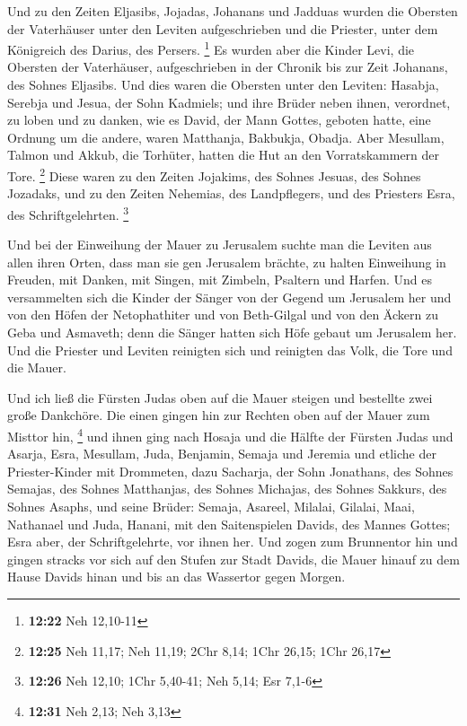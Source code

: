  Und zu den Zeiten Eljasibs, Jojadas, Johanans und
Jadduas wurden die Obersten der Vaterhäuser unter den Leviten
aufgeschrieben und die Priester, unter dem Königreich des Darius, des
Persers. \footnote{\textbf{12:22} Neh 12,10-11}  Es
wurden aber die Kinder Levi, die Obersten der Vaterhäuser,
aufgeschrieben in der Chronik bis zur Zeit Johanans, des Sohnes
Eljasibs.  Und dies waren die Obersten unter den Leviten:
Hasabja, Serebja und Jesua, der Sohn Kadmiels; und ihre Brüder neben
ihnen, verordnet, zu loben und zu danken, wie es David, der Mann Gottes,
geboten hatte, eine Ordnung um die andere,  waren
Matthanja, Bakbukja, Obadja. Aber Mesullam, Talmon und Akkub, die
Torhüter, hatten die Hut an den Vorratskammern der Tore. \footnote{\textbf{12:25}
  Neh 11,17; Neh 11,19; 2Chr 8,14; 1Chr 26,15; 1Chr 26,17}
 Diese waren zu den Zeiten Jojakims, des Sohnes Jesuas,
des Sohnes Jozadaks, und zu den Zeiten Nehemias, des Landpflegers, und
des Priesters Esra, des Schriftgelehrten. \footnote{\textbf{12:26} Neh
  12,10; 1Chr 5,40-41; Neh 5,14; Esr 7,1-6}

 Und bei der Einweihung der Mauer zu Jerusalem suchte man
die Leviten aus allen ihren Orten, dass man sie gen Jerusalem brächte,
zu halten Einweihung in Freuden, mit Danken, mit Singen, mit Zimbeln,
Psaltern und Harfen.  Und es versammelten sich die Kinder
der Sänger von der Gegend um Jerusalem her und von den Höfen der
Netophathiter  und von Beth-Gilgal und von den Äckern zu
Geba und Asmaveth; denn die Sänger hatten sich Höfe gebaut um Jerusalem
her.  Und die Priester und Leviten reinigten sich und
reinigten das Volk, die Tore und die Mauer.

 Und ich ließ die Fürsten Judas oben auf die Mauer
steigen und bestellte zwei große Dankchöre. Die einen gingen hin zur
Rechten oben auf der Mauer zum Misttor hin, \footnote{\textbf{12:31} Neh
  2,13; Neh 3,13}  und ihnen ging nach Hosaja und die
Hälfte der Fürsten Judas  und Asarja, Esra, Mesullam,
 Juda, Benjamin, Semaja und Jeremia  und
etliche der Priester-Kinder mit Drommeten, dazu Sacharja, der Sohn
Jonathans, des Sohnes Semajas, des Sohnes Matthanjas, des Sohnes
Michajas, des Sohnes Sakkurs, des Sohnes Asaphs,  und
seine Brüder: Semaja, Asareel, Milalai, Gilalai, Maai, Nathanael und
Juda, Hanani, mit den Saitenspielen Davids, des Mannes Gottes; Esra
aber, der Schriftgelehrte, vor ihnen her.  Und zogen zum
Brunnentor hin und gingen stracks vor sich auf den Stufen zur Stadt
Davids, die Mauer hinauf zu dem Hause Davids hinan und bis an das
Wassertor gegen Morgen.

